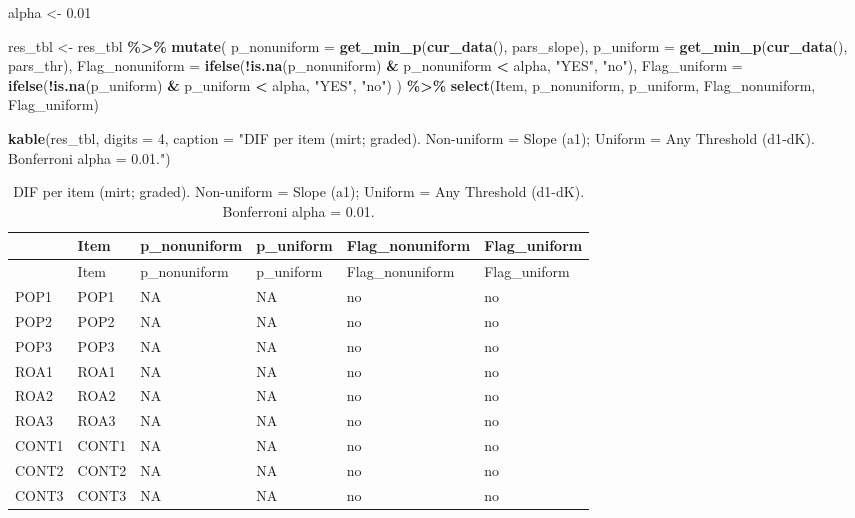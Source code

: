 \documentclass[
  10pt,
]{article}
\newenvironment{Shaded}{\begin{snugshade}}{\end{snugshade}}
\newcommand{\AttributeTok}[1]{\textcolor[rgb]{0.13,0.29,0.53}{#1}}
\newcommand{\DecValTok}[1]{\textcolor[rgb]{0.00,0.00,0.81}{#1}}
\newcommand{\FloatTok}[1]{\textcolor[rgb]{0.00,0.00,0.81}{#1}}
\newcommand{\FunctionTok}[1]{\textcolor[rgb]{0.13,0.29,0.53}{\textbf{#1}}}
\newcommand{\NormalTok}[1]{#1}
\newcommand{\OtherTok}[1]{\textcolor[rgb]{0.56,0.35,0.01}{#1}}
\newcommand{\SpecialCharTok}[1]{\textcolor[rgb]{0.81,0.36,0.00}{\textbf{#1}}}
\newcommand{\StringTok}[1]{\textcolor[rgb]{0.31,0.60,0.02}{#1}}
\begin{document}
\begin{Shaded}
\begin{Highlighting}[]
\NormalTok{alpha }\OtherTok{\textless{}{-}} \FloatTok{0.01}

\NormalTok{res\_tbl }\OtherTok{\textless{}{-}}\NormalTok{ res\_tbl }\SpecialCharTok{\%\textgreater{}\%}
  \FunctionTok{mutate}\NormalTok{(}
    \AttributeTok{p\_nonuniform =} \FunctionTok{get\_min\_p}\NormalTok{(}\FunctionTok{cur\_data}\NormalTok{(), pars\_slope),}
    \AttributeTok{p\_uniform    =} \FunctionTok{get\_min\_p}\NormalTok{(}\FunctionTok{cur\_data}\NormalTok{(), pars\_thr),}
    \AttributeTok{Flag\_nonuniform =} \FunctionTok{ifelse}\NormalTok{(}\SpecialCharTok{!}\FunctionTok{is.na}\NormalTok{(p\_nonuniform) }\SpecialCharTok{\&}\NormalTok{ p\_nonuniform }\SpecialCharTok{\textless{}}\NormalTok{ alpha, }\StringTok{"YES"}\NormalTok{, }\StringTok{"no"}\NormalTok{),}
    \AttributeTok{Flag\_uniform    =} \FunctionTok{ifelse}\NormalTok{(}\SpecialCharTok{!}\FunctionTok{is.na}\NormalTok{(p\_uniform)    }\SpecialCharTok{\&}\NormalTok{ p\_uniform    }\SpecialCharTok{\textless{}}\NormalTok{ alpha, }\StringTok{"YES"}\NormalTok{, }\StringTok{"no"}\NormalTok{)}
\NormalTok{  ) }\SpecialCharTok{\%\textgreater{}\%}
  \FunctionTok{select}\NormalTok{(Item, p\_nonuniform, p\_uniform, Flag\_nonuniform, Flag\_uniform)}

\FunctionTok{kable}\NormalTok{(res\_tbl, }\AttributeTok{digits =} \DecValTok{4}\NormalTok{,}
      \AttributeTok{caption =} \StringTok{"DIF per item (mirt; graded). Non{-}uniform = Slope (a1); Uniform = Any Threshold (d1{-}dK). Bonferroni alpha = 0.01."}\NormalTok{)}
\end{Highlighting}
\end{Shaded}

\begin{longtable}[]{@{}llllll@{}}
\caption{DIF per item (mirt; graded). Non-uniform = Slope (a1); Uniform
= Any Threshold (d1-dK). Bonferroni alpha = 0.01.}\tabularnewline
\toprule\noalign{}
& Item & p\_nonuniform & p\_uniform & Flag\_nonuniform &
Flag\_uniform \\
\midrule\noalign{}
\endfirsthead
\toprule\noalign{}
& Item & p\_nonuniform & p\_uniform & Flag\_nonuniform &
Flag\_uniform \\
\midrule\noalign{}
\endhead
\bottomrule\noalign{}
\endlastfoot
POP1 & POP1 & NA & NA & no & no \\
POP2 & POP2 & NA & NA & no & no \\
POP3 & POP3 & NA & NA & no & no \\
ROA1 & ROA1 & NA & NA & no & no \\
ROA2 & ROA2 & NA & NA & no & no \\
ROA3 & ROA3 & NA & NA & no & no \\
CONT1 & CONT1 & NA & NA & no & no \\
CONT2 & CONT2 & NA & NA & no & no \\
CONT3 & CONT3 & NA & NA & no & no \\
\end{longtable}
\end{document}

